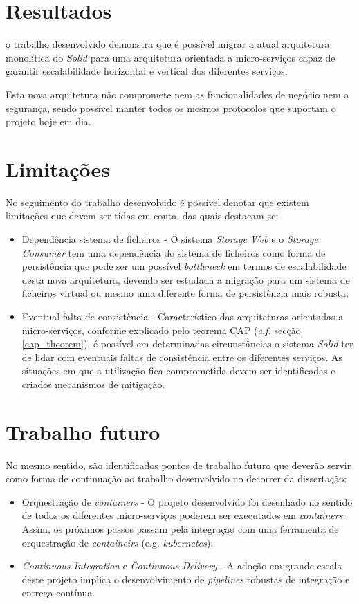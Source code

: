 \section{Resultados}
o trabalho desenvolvido demonstra que é possível migrar a atual arquitetura monolítica do \emph{Solid} para uma arquitetura orientada a micro-serviços capaz de garantir escalabilidade horizontal e vertical dos diferentes serviços.

Esta nova arquitetura não compromete nem as funcionalidades de negócio nem a segurança, sendo possível manter todos os mesmos protocolos que suportam o projeto hoje em dia.

\section{Limitações}

No seguimento do trabalho desenvolvido é possível denotar que existem limitações que devem ser tidas em conta, das quais destacam-se:

\begin{itemize}
    \item Dependência sistema de ficheiros - O sistema \emph{Storage Web} e o \emph{Storage Consumer} tem uma dependência do sistema de ficheiros como forma de persistência que pode ser um possível \emph{bottleneck} em termos de escalabilidade desta nova arquitetura, devendo ser estudada a migração para um sistema de ficheiros virtual ou mesmo uma diferente forma de persistência mais robusta;
    \item Eventual falta de consistência - Característico das arquiteturas orientadas a micro-serviços, conforme explicado pelo teorema \acrshort{CAP} (\emph{c.f.} secção \ref{cap_theorem}), é possível em determinadas circunstâncias o sistema \emph{Solid} ter de lidar com eventuais faltas de consistência entre os diferentes serviços. As situações em que a utilização fica comprometida devem ser identificadas e criados mecanismos de mitigação.
\end{itemize}

\section{Trabalho futuro}
No mesmo sentido, são identificados pontos de trabalho futuro que deverão servir como forma de continuação ao trabalho desenvolvido no decorrer da dissertação:

\begin{itemize}
    \item Orquestração de \emph{containers} - O projeto desenvolvido foi desenhado no sentido de todos os diferentes micro-serviços poderem ser executados em \emph{containers}. Assim, os próximos passos passam pela integração com uma ferramenta de orquestração de \emph{containeirs} (e.g. \emph{kubernetes});
    \item \emph{Continuous Integration} e \emph{Continuous Delivery} - A adoção em grande escala deste projeto implica o desenvolvimento de \emph{pipelines} robustas de integração e entrega contínua.
\end{itemize}


